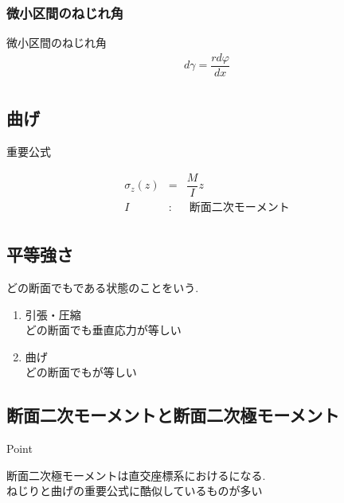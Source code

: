 \documentclass[a4paper]{jsarticle}
\begin{document}
\subsubsection{微小区間のねじれ角}
\begin{itembox}[l]{微小区間のねじれ角}
    \begin{eqnarray*}
        d\gamma=\dfrac{rd\varphi}{dx}\\
    \end{eqnarray*}
\end{itembox}
\subsection{曲げ}
\begin{itembox}[l]{重要公式}
    \begin{center}
        \begin{eqnarray*}
            \sigma_z\left(z\right)&=&\dfrac{M}{I}z\\
            I&:&\;断面二次モーメント\\
        \end{eqnarray*}
    \end{center}
\end{itembox}
\subsection{平等強さ}
どの断面でもである状態のことをいう.\\
\begin{enumerate}[(1)]
    \item 引張・圧縮\\
          どの断面でも垂直応力が等しい
    \item 曲げ\\
          どの断面でもが等しい
\end{enumerate}
\subsection{断面二次モーメントと断面二次極モーメント}
\begin{itembox}[l]{Point}
    \begin{center}
        断面二次極モーメントは直交座標系におけるになる.\\
        ねじりと曲げの重要公式に酷似しているものが多い
    \end{center}
\end{itembox}
\end{document}
